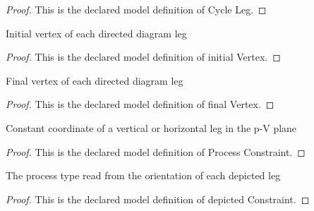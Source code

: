 \begin{proof}
  This is the declared model definition of Cycle Leg.
\end{proof}
\begin{definition}
  \label{def:physics:phyx-mini-0349:phyxminiproblems-problemphyxmini0349-cycleleg-initialvertex}
  Initial vertex of each directed diagram leg
\end{definition}
\begin{proof}
  This is the declared model definition of initial Vertex.
\end{proof}
\begin{definition}
  \label{def:physics:phyx-mini-0349:phyxminiproblems-problemphyxmini0349-cycleleg-finalvertex}
  Final vertex of each directed diagram leg
\end{definition}
\begin{proof}
  This is the declared model definition of final Vertex.
\end{proof}
\begin{definition}
  \label{def:physics:phyx-mini-0349:phyxminiproblems-problemphyxmini0349-processconstraint}
  Constant coordinate of a vertical or horizontal leg in the p-V plane
\end{definition}
\begin{proof}
  This is the declared model definition of Process Constraint.
\end{proof}
\begin{definition}
  \label{def:physics:phyx-mini-0349:phyxminiproblems-problemphyxmini0349-cycleleg-depictedconstraint}
  The process type read from the orientation of each depicted leg
\end{definition}
\begin{proof}
  This is the declared model definition of depicted Constraint.
\end{proof}
